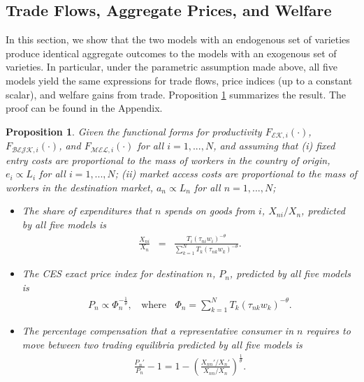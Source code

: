\documentclass[12pt,dvips, ps2pdf]{article}
\newtheorem{prp}{Proposition}
\begin{document}
\subsection{Trade Flows, Aggregate Prices, and Welfare}
In this section, we show that the two models with an endogenous set of varieties produce identical aggregate outcomes to the models with an exogenous set of varieties. In particular, under the parametric assumption made above, all five models yield the same expressions for trade flows, price indices (up to a constant scalar), and welfare gains from trade. Proposition \ref{prop_agg_end} summarizes the result. The proof can be found in the Appendix.
\begin{prp}
\label{prop_agg_end}
Given the functional forms for productivity $F_{\mathcal{EK},i}(\cdot)$, $F_{\mathcal{BEJK},i}(\cdot)$, and $F_{\mathcal{MEL},i}(\cdot)$ for all $i=1,...,N$, and assuming that (i) fixed entry costs are proportional to the mass of workers in the country of origin, $e_i\propto L_i$ for all $i=1,...,N$; (ii) market access costs are proportional to the mass of workers in the destination market, $a_n\propto L_n$ for all $n=1,...,N$;
\begin{itemize}
\item[a.] The share of expenditures that $n$ spends on goods from $i$, $X_{ni}/X_n$, predicted by all five models is
\begin{eqnarray}
\displaystyle \label{trdshrs_mel} \frac{X_{ni}}{X_n}&=&\frac{T_i(\tau_{ni}w_i)^{-\theta}}{\sum_{k=1}^NT_k(\tau_{nk}w_k)^{-\theta}}.
\end{eqnarray}
\item[b.] The CES exact price index for destination $n$, $P_n$, predicted by all five models is
\begin{eqnarray}
\label{P_mel}
P_n\propto \Phi_n^{-\frac{1}{\theta}}, \ \ \ \ \mbox{where} \ \ \ \ \Phi_n = \sum_{k=1}^NT_k(\tau_{nk}w_k)^{-\theta}.
\end{eqnarray}
\item[c.] The percentage compensation that a representative consumer in $n$ requires to move between two trading equilibria predicted by all five models is
\begin{eqnarray}
\label{welfare_mel}
\frac{P_n'}{P_n}-1=1-\left(\frac{X_{nn}'/X_{n}'}{X_{nn}/X_n}\right)^\frac{1}{\theta}.
\end{eqnarray}
\end{itemize}
\end{prp}
\end{document}
